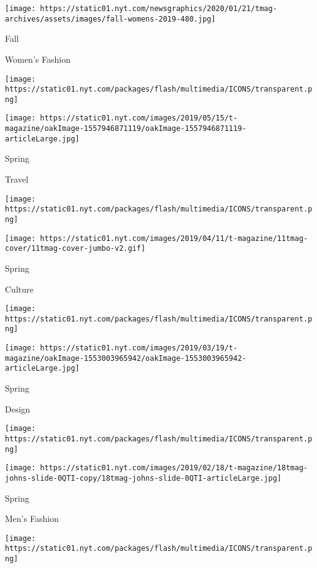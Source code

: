 \texttt{[image: https://static01.nyt.com/newsgraphics/2020/01/21/tmag-archives/assets/images/fall-womens-2019-480.jpg]}

Fall

Women's Fashion

\href{https://www.nytimes.com/issue/t-magazine/2019/05/08/ts-may-19-travel-issue}{}

\texttt{[image: https://static01.nyt.com/packages/flash/multimedia/ICONS/transparent.png]}

\texttt{[image: https://static01.nyt.com/images/2019/05/15/t-magazine/oakImage-1557946871119/oakImage-1557946871119-articleLarge.jpg]}

Spring

Travel

\href{https://www.nytimes.com/issue/t-magazine/2019/04/06/ts-april-14-culture-issue}{}

\texttt{[image: https://static01.nyt.com/packages/flash/multimedia/ICONS/transparent.png]}

\texttt{[image: https://static01.nyt.com/images/2019/04/11/t-magazine/11tmag-cover/11tmag-cover-jumbo-v2.gif]}

Spring

Culture

\href{https://www.nytimes.com/issue/t-magazine/2019/03/11/ts-march-24-design-issue}{}

\texttt{[image: https://static01.nyt.com/packages/flash/multimedia/ICONS/transparent.png]}

\texttt{[image: https://static01.nyt.com/images/2019/03/19/t-magazine/oakImage-1553003965942/oakImage-1553003965942-articleLarge.jpg]}

Spring

Design

\href{https://www.nytimes.com/issue/t-magazine/2019/02/20/ts-march-3-mens-fashion-issue}{}

\texttt{[image: https://static01.nyt.com/packages/flash/multimedia/ICONS/transparent.png]}

\texttt{[image: https://static01.nyt.com/images/2019/02/18/t-magazine/18tmag-johns-slide-0QTI-copy/18tmag-johns-slide-0QTI-articleLarge.jpg]}

Spring

Men's Fashion

\href{https://www.nytimes.com/issue/t-magazine/2019/02/04/ts-feb-17-womens-fashion-issue}{}

\texttt{[image: https://static01.nyt.com/packages/flash/multimedia/ICONS/transparent.png]}

